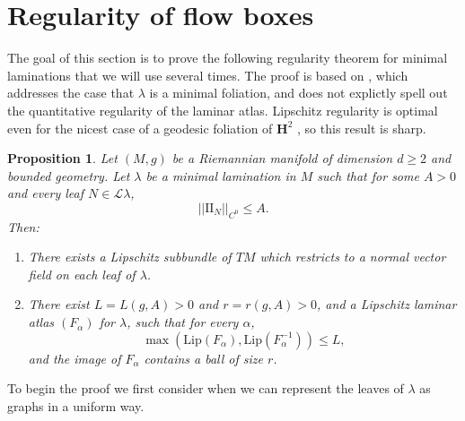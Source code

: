\documentclass[reqno,11pt]{amsart}
\newcommand{\Hyp}{\mathbf H}
\newcommand{\Leaves}{\mathscr L}
\newcommand{\Two}{\mathrm{I\!I}}
\newcommand{\Lip}{\mathrm{Lip}}
\newtheorem{proposition}[theorem]{Proposition}
\theoremstyle{definition}
\numberwithin{equation}{section}
\begin{document}
\section{Regularity of flow boxes}\label{Regularity}
The goal of this section is to prove the following regularity theorem for minimal laminations that we will use several times.
The proof is based on \cite[Theorem 1.1]{Solomon86}, which addresses the case that $\lambda$ is a minimal foliation, and does not explictly spell out the quantitative regularity of the laminar atlas.
Lipschitz regularity is optimal even for the nicest case of a geodesic foliation of $\Hyp^2$ \cite[\S1]{Solomon86}, so this result is sharp.

\begin{proposition}\label{regularity theorem}
Let $(M, g)$ be a Riemannian manifold of dimension $d \geq 2$ and bounded geometry.
Let $\lambda$ be a minimal lamination in $M$ such that for some $A > 0$ and every leaf $N \in \Leaves \lambda$,
$$||\Two_N||_{C^0} \leq A.$$
Then:
\begin{enumerate}
\item There exists a Lipschitz subbundle of $TM$ which restricts to a normal vector field on each leaf of $\lambda$.
\item There exist $L = L(g, A) > 0$ and $r = r(g, A) > 0$, and a Lipschitz laminar atlas $(F_\alpha)$ for $\lambda$, such that for every $\alpha$,
\begin{equation}\label{conorm of flow box}
	\max(\Lip(F_\alpha), \Lip(F_\alpha^{-1})) \leq L,
\end{equation}
and the image of $F_\alpha$ contains a ball of size $r$.
\end{enumerate}
\end{proposition}

To begin the proof we first consider when we can represent the leaves of $\lambda$ as graphs in a uniform way.
\end{document}

